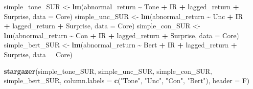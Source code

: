 \documentclass[
]{article}
\newenvironment{Shaded}{\begin{snugshade}}{\end{snugshade}}
\newcommand{\AttributeTok}[1]{\textcolor[rgb]{0.13,0.29,0.53}{#1}}
\newcommand{\FunctionTok}[1]{\textcolor[rgb]{0.13,0.29,0.53}{\textbf{#1}}}
\newcommand{\NormalTok}[1]{#1}
\newcommand{\OtherTok}[1]{\textcolor[rgb]{0.56,0.35,0.01}{#1}}
\newcommand{\SpecialCharTok}[1]{\textcolor[rgb]{0.81,0.36,0.00}{\textbf{#1}}}
\newcommand{\StringTok}[1]{\textcolor[rgb]{0.31,0.60,0.02}{#1}}
\begin{document}
\begin{Shaded}
\begin{Highlighting}[]
\NormalTok{simple\_tone\_SUR }\OtherTok{\textless{}{-}} \FunctionTok{lm}\NormalTok{(abnormal\_return }\SpecialCharTok{\textasciitilde{}}\NormalTok{ Tone }\SpecialCharTok{+}\NormalTok{ IR }\SpecialCharTok{+}\NormalTok{ lagged\_return }\SpecialCharTok{+}\NormalTok{ Surprise, }\AttributeTok{data =}\NormalTok{ Core)}
\NormalTok{simple\_unc\_SUR }\OtherTok{\textless{}{-}} \FunctionTok{lm}\NormalTok{(abnormal\_return }\SpecialCharTok{\textasciitilde{}}\NormalTok{ Unc }\SpecialCharTok{+}\NormalTok{ IR }\SpecialCharTok{+}\NormalTok{ lagged\_return }\SpecialCharTok{+}\NormalTok{ Surprise, }\AttributeTok{data =}\NormalTok{ Core)}
\NormalTok{simple\_con\_SUR }\OtherTok{\textless{}{-}} \FunctionTok{lm}\NormalTok{(abnormal\_return }\SpecialCharTok{\textasciitilde{}}\NormalTok{ Con }\SpecialCharTok{+}\NormalTok{ IR }\SpecialCharTok{+}\NormalTok{ lagged\_return }\SpecialCharTok{+}\NormalTok{ Surprise, }\AttributeTok{data =}\NormalTok{ Core)}
\NormalTok{simple\_bert\_SUR }\OtherTok{\textless{}{-}} \FunctionTok{lm}\NormalTok{(abnormal\_return }\SpecialCharTok{\textasciitilde{}}\NormalTok{ Bert }\SpecialCharTok{+}\NormalTok{ IR }\SpecialCharTok{+}\NormalTok{ lagged\_return }\SpecialCharTok{+}\NormalTok{ Surprise, }\AttributeTok{data =}\NormalTok{ Core)}

\FunctionTok{stargazer}\NormalTok{(simple\_tone\_SUR, simple\_unc\_SUR, simple\_con\_SUR, simple\_bert\_SUR, }\AttributeTok{column.labels =} \FunctionTok{c}\NormalTok{(}\StringTok{"Tone"}\NormalTok{, }\StringTok{"Unc"}\NormalTok{, }\StringTok{"Con"}\NormalTok{, }\StringTok{"Bert"}\NormalTok{), }\AttributeTok{header =}\NormalTok{ F)}
\end{Highlighting}
\end{Shaded}
\end{document}
